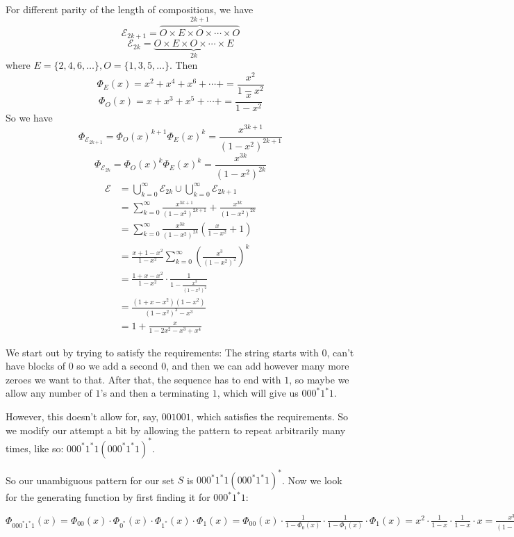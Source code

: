\begin{enumerate}
    For different parity of the length of compositions, we have $$\mathcal{E}_{2k+1} = \overbrace{O \times E \times O \times \cdots \times O}^\text{$2k+1$} $$
    $$\mathcal{E}_{2k} =  \underbrace{O \times E \times O \times \cdots \times E}_\text{$2k$}
    $$
    where $E = \{2, 4, 6 ,\dots\}, O = \{1, 3, 5, \dots\}$. Then $$
    \Phi_E(x) = x^2 + x^4 + x^6 + \cdots + = \frac{x^2}{1-x^2}
    $$
    $$
    \Phi_O(x) = x + x^3 + x^5 + \cdots + = \frac{x}{1-x^2}$$
    So we have 
    $$\Phi_{\mathcal{E}_{2k+1}} = \Phi_O(x)^{k+1} \Phi_E(x)^k = \frac{x^{3k+1}}{(1-x^2)^{2k+1}}
    $$
    $$\Phi_{\mathcal{E}_{2k}} = \Phi_O(x)^{k} \Phi_E(x)^k = \frac{x^{3k}}{(1-x^2)^{2k}}
    $$
    \begin{align*}   
    \mathcal{E} &= \bigcup_{k=0}^\infty \mathcal{E}_{2k} \cup \bigcup_{k=0}^\infty \mathcal{E}_{2k+1}\\
    &= \sum_{k=0}^{\infty} \frac{x^{3k+1}}{(1-x^2)^{2k+1}} +  \frac{x^{3k}}{(1-x^2)^{2k}} \\
    &= \sum_{k=0}^{\infty}\frac{x^{3k}}{(1-x^2)^{2k}} (\frac{x}{1-x^2} + 1) \\
    &= \frac{x + 1 - x^2}{1-x^2} \sum_{k=0}^{\infty} \left(\frac{x^3}{(1-x^2)^2}\right)^k
    \\
    &= \frac{1 + x - x^2}{1-x^2} \cdot \frac{1}{1 - \frac{x^3}{(1-x^2)^2}}\\
    &= \frac{(1+x-x^2)(1-x^2)}{(1-x^2)^2 - x^3} \\
    &= 1 + \frac{x}{1-2x^2 - x^3 + x^4}
    \end{align*}
    
    \newpage
    
      We start out by trying to satisfy the requirements: The string starts with $0$, can't have blocks of $0$ so we add a second $0$, and then we can add however many more zeroes we want to that. After that, the sequence has to end with $1$, so maybe we allow any number of $1$'s and then a terminating $1$, which will give us $000^*1^*1$.

     However, this doesn't allow for, say, $001001$, which satisfies the requirements. So we modify our attempt a bit by allowing the pattern to repeat arbitrarily many times, like so: $000^*1^*1(000^*1^*1)^*$. 

     So our unambiguous pattern for our set $S$ is $000^*1^*1(000^*1^*1)^*$. Now we look for the generating function by first finding it for $000^*1^*1$: 

\begin{center}
    $\Phi_{000^*1^*1}(x) = \Phi_{00}(x) \cdot \Phi_{0^*}(x) \cdot \Phi_{1^*}(x) \cdot \Phi_{1}(x) = \Phi_{00}(x) \cdot 
     \frac{1}{1-\Phi_{0}(x)} \cdot \frac{1}{1 - \Phi_{1}(x)} \cdot \Phi_{1}(x) = x^2 \cdot \frac{1}{1-x} \cdot \frac{1}{1 -x} \cdot x = \frac{x^3}{(1 - x)^2}$
\end{center}


\end{enumerate}
